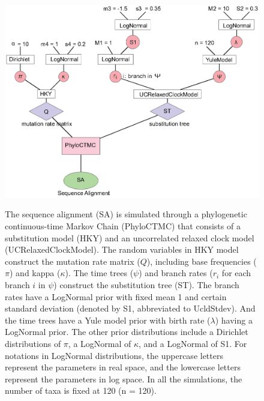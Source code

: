 \documentclass{bmcart}
\begin{document}
\begin{backmatter}
\begin{figure}[h!]
\includegraphics[width=12cm]{Fig11-modelvalidation.eps}\\
\caption{
             The sequence alignment (SA) is simulated through a phylogenetic continuous-time Markov Chain (PhyloCTMC) that consists of a substitution model (HKY) and an uncorrelated relaxed clock model (UCRelaxedClockModel). The random variables in HKY model construct the mutation rate matrix ($Q$), including base frequencies ($\pi$) and kappa ($\kappa$). The time trees ($\psi$) and branch rates ($r_i$ for each branch $i$ in $\psi$) construct the substitution tree (ST). The branch rates have a LogNormal prior with fixed mean 1 and certain standard deviation (denoted by S1, abbreviated to UcldStdev). And the time trees have a Yule model prior with birth rate ($\lambda$) having a LogNormal prior. The other prior distributions include a Dirichlet distributions of $\pi$, a LogNormal of $\kappa$, and a LogNormal of S1. For notations in LogNormal distributions, the uppercase letters represent the parameters in real space, and the lowercase letters represent the parameters in log space. In all the simulations, the number of taxa is fixed at 120 (n = 120).}
\label{modelvalidation}
\end{figure}


\end{backmatter}
\end{document}
